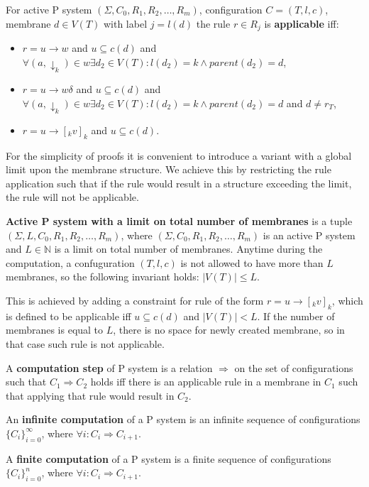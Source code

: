 
For active P system $(\Sigma, C_0, R_1, R_2, \dots , R_m)$, configuration $C = (T, l, c)$, membrane $d\in V(T)$ with label $j = l(d)$ the rule $r\in R_j$ is {\bf applicable} iff:
\begin{itemize}
  \item $r = u\rightarrow w$ and $u\subseteq c(d)$ and $\forall (a,\downarrow_k)\in w \exists d_2\in V(T): l(d_2)=k \wedge parent(d_2) = d$,
  \item $r = u\rightarrow w\delta$ and $u\subseteq c(d)$ and $\forall (a,\downarrow_k)\in w \exists d_2\in V(T): l(d_2)=k \wedge parent(d_2) = d$ and $d\neq r_T$,
  \item $r = u\rightarrow [_k v]_k$ and $u\subseteq c(d)$.
\end{itemize}


For the simplicity of proofs it is convenient to introduce a variant with a global limit upon the membrane structure. We achieve this by restricting the rule application such that if the rule would result in a structure exceeding the limit, the rule will not be applicable.

{\bf Active P system with a limit on total number of membranes} is a tuple $(\Sigma, L, C_0, R_1, R_2, \dots , R_m)$, where $(\Sigma, C_0, R_1, R_2, \dots , R_m)$ is an active P system and $L\in \mathbb N$ is a limit on total number of membranes. Anytime during the computation, a confuguration $(T, l, c)$ is not allowed to have more than $L$ membranes, so the following invariant holds: $|V(T)|\leq L$.

This is achieved by adding a constraint for rule of the form $r = u\rightarrow [_k v]_k$, which is defined to be applicable iff $u\subseteq c(d)$ and $|V(T)|<L$. If the number of membranes is equal to $L$, there is no space for newly created membrane, so in that case such rule is not applicable.

A {\bf computation step} of P system is a relation $\Rightarrow$ on the set of configurations such that $C_1 \Rightarrow C_2$ holds iff there is an applicable rule in a membrane in $C_1$ such that applying that rule would result in $C_2$.

An {\bf infinite computation} of a P system is an infinite sequence of configurations $\{C_i\}_{i=0}^\infty$, where $\forall i: C_i\Rightarrow C_{i+1}$.

A {\bf finite computation} of a P system is a finite sequence of configurations $\{C_i\}_{i=0}^n$, where $\forall i: C_i\Rightarrow C_{i+1}$.

